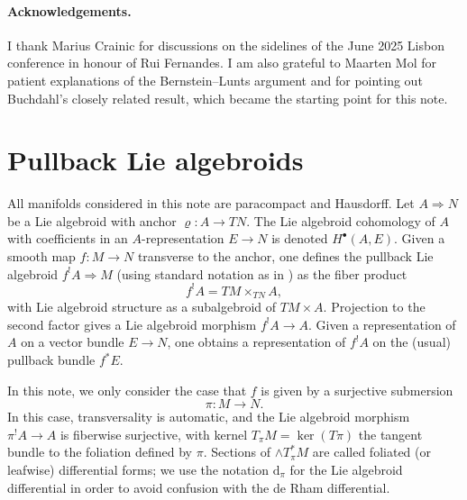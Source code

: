 \documentclass[11pt]{amsart}
\theoremstyle{definition}
\theoremstyle{remark}
\newcommand{\Ra}{\Rightarrow}
\newcommand{\on}{\operatorname}
\renewcommand{\ker}{ \on{ker}}
\renewcommand{\d}{{\mbox{d}}}
\begin{document}
\bigskip
\paragraph{\bf Acknowledgements.}
I thank Marius Crainic for discussions on the sidelines of the June
2025 Lisbon conference in honour of Rui Fernandes. I am also grateful to
Maarten Mol for patient explanations of the Bernstein--Lunts argument
and for pointing out Buchdahl's closely related result, which became
the starting point for this note.











\section{Pullback Lie algebroids}
%
All manifolds considered in this note are paracompact and Hausdorff. 
Let $A\Ra N$ be a Lie algebroid with anchor $\varrho\colon A\to TN$. The Lie algebroid cohomology of $A$ with coefficients in an $A$-representation 
$E\to N$ is denoted $H^\bullet(A,E)$. Given a smooth map $f\colon M\to N$ transverse to the anchor, one defines 
the pullback Lie algebroid $f^!A\Ra M$ (using standard notation as in \cite[Section 13.4]{cra:lec}) as the fiber product 
\[ f^!A=TM\times_{TN} A,\]
with Lie algebroid structure as a subalgebroid of $TM\times A$. Projection to the second factor gives a Lie algebroid morphism $f^!A\to A$. 
Given a representation of $A$ on a vector bundle $E\to N$, one obtains a representation of 
$f^!A$ on the (usual) pullback bundle $f^*E$. 

In this note, we only consider the case that $f$ is given by a surjective submersion 
%
\[\pi\colon M\to N.\]
%
In this case, transversality is automatic, and the Lie algebroid morphism $\pi^!A\to A$ is fiberwise surjective,  with kernel
$T_\pi M=\ker(T\pi)$ the tangent bundle to the foliation defined by $\pi$. Sections of $\wedge T_\pi^* M$ are called foliated (or leafwise) 
differential forms; we use the notation $\d_\pi$ for the Lie algebroid differential in order to avoid confusion with the de Rham differential.
\end{document}
